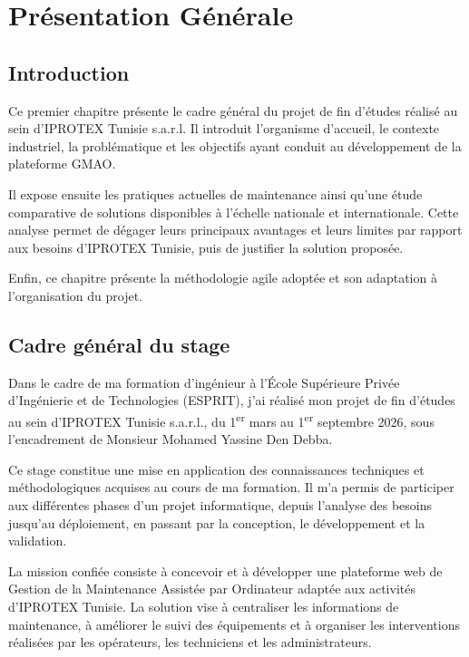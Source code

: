 \newpage 

\section{Présentation Générale}
 
\subsection{Introduction}

Ce premier chapitre présente le cadre général du projet de fin d’études réalisé au sein d’IPROTEX Tunisie s.a.r.l. Il introduit l’organisme d’accueil, le contexte industriel, la problématique et les objectifs ayant conduit au développement de la plateforme GMAO.

Il expose ensuite les pratiques actuelles de maintenance ainsi qu’une étude comparative de solutions disponibles à l’échelle nationale et internationale. Cette analyse permet de dégager leurs principaux avantages et leurs limites par rapport aux besoins d’IPROTEX Tunisie, puis de justifier la solution proposée.

Enfin, ce chapitre présente la méthodologie agile adoptée et son adaptation à l’organisation du projet.

\subsection{Cadre général du stage}

Dans le cadre de ma formation d’ingénieur à l’École Supérieure Privée d’Ingénierie et de Technologies (ESPRIT), j’ai réalisé mon projet de fin d’études au sein d’IPROTEX Tunisie s.a.r.l., du 1\textsuperscript{er} mars au 1\textsuperscript{er} septembre 2026, sous l’encadrement de Monsieur Mohamed Yassine Den Debba.

Ce stage constitue une mise en application des connaissances techniques et méthodologiques acquises au cours de ma formation. Il m’a permis de participer aux différentes phases d’un projet informatique, depuis l’analyse des besoins jusqu’au déploiement, en passant par la conception, le développement et la validation.

La mission confiée consiste à concevoir et à développer une plateforme web de Gestion de la Maintenance Assistée par Ordinateur adaptée aux activités d’IPROTEX Tunisie. La solution vise à centraliser les informations de maintenance, à améliorer le suivi des équipements et à organiser les interventions réalisées par les opérateurs, les techniciens et les administrateurs.


